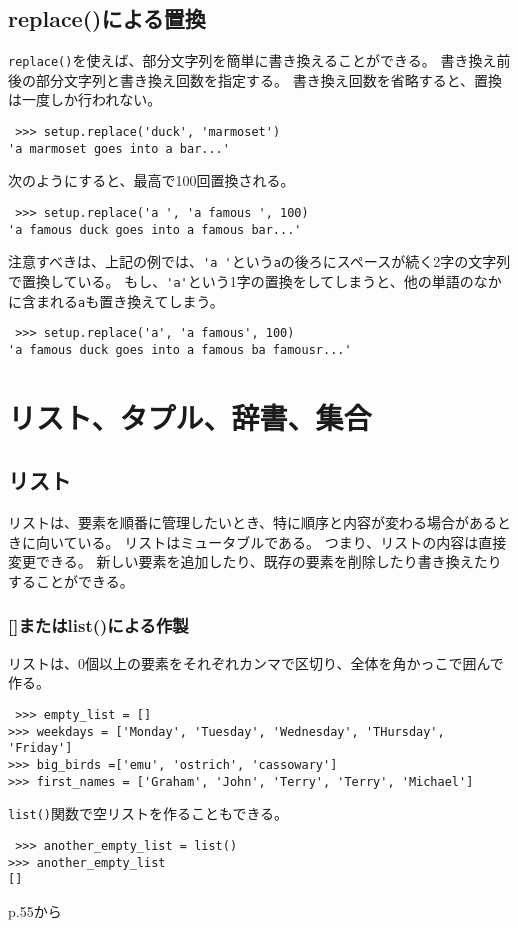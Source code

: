 \documentclass[11pt, oneside]{article}   	%
\begin{document}
 \subsection{replace()による置換}
\verb|replace()|を使えば、部分文字列を簡単に書き換えることができる。
書き換え前後の部分文字列と書き換え回数を指定する。
書き換え回数を省略すると、置換は一度しか行われない。
 \begin{lstlisting}
 >>> setup.replace('duck', 'marmoset')
'a marmoset goes into a bar...'
\end{lstlisting}
次のようにすると、最高で100回置換される。
 \begin{lstlisting}
 >>> setup.replace('a ', 'a famous ', 100)
'a famous duck goes into a famous bar...'
\end{lstlisting}
注意すべきは、上記の例では、\verb|'a '|という\verb|a|の後ろにスペースが続く2字の文字列で置換している。
もし、\verb|'a'|という1字の置換をしてしまうと、他の単語のなかに含まれる\verb|a|も置き換えてしまう。
\begin{lstlisting}
 >>> setup.replace('a', 'a famous', 100)
'a famous duck goes into a famous ba famousr...'
\end{lstlisting}


\section{リスト、タプル、辞書、集合}
\subsection{リスト}
リストは、要素を順番に管理したいとき、特に順序と内容が変わる場合があるときに向いている。
リストはミュータブルである。
つまり、リストの内容は直接変更できる。
新しい要素を追加したり、既存の要素を削除したり書き換えたりすることができる。

\subsubsection{[]またはlist()による作製}
リストは、0個以上の要素をそれぞれカンマで区切り、全体を角かっこで囲んで作る。
\begin{lstlisting}
 >>> empty_list = []
>>> weekdays = ['Monday', 'Tuesday', 'Wednesday', 'THursday', 'Friday']
>>> big_birds =['emu', 'ostrich', 'cassowary']
>>> first_names = ['Graham', 'John', 'Terry', 'Terry', 'Michael']
\end{lstlisting}
\verb|list()|関数で空リストを作ることもできる。
\begin{lstlisting}
 >>> another_empty_list = list()
>>> another_empty_list
[]
\end{lstlisting}

p.55から


 
\end{document}
